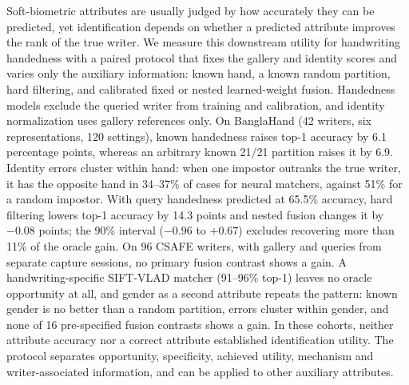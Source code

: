 Soft-biometric attributes are usually judged by how accurately they can be predicted, yet identification depends on whether a predicted attribute improves the rank of the true writer. We measure this downstream utility for handwriting handedness with a paired protocol that fixes the gallery and identity scores and varies only the auxiliary information: known hand, a known random partition, hard filtering, and calibrated fixed or nested learned-weight fusion. Handedness models exclude the queried writer from training and calibration, and identity normalization uses gallery references only. On BanglaHand (42 writers, six representations, 120 settings), known handedness raises top-1 accuracy by 6.1 percentage points, whereas an arbitrary known 21/21 partition raises it by 6.9. Identity errors cluster within hand: when one impostor outranks the true writer, it has the opposite hand in 34--37\% of cases for neural matchers, against 51\% for a random impostor. With query handedness predicted at 65.5\% accuracy, hard filtering lowers top-1 accuracy by 14.3 points and nested fusion changes it by $-0.08$ points; the 90\% interval ($-0.96$ to $+0.67$) excludes recovering more than 11\% of the oracle gain. On 96 CSAFE writers, with gallery and queries from separate capture sessions, no primary fusion contrast shows a gain. A handwriting-specific SIFT-VLAD matcher (91--96\% top-1) leaves no oracle opportunity at all, and gender as a second attribute repeats the pattern: known gender is no better than a random partition, errors cluster within gender, and none of 16 pre-specified fusion contrasts shows a gain. In these cohorts, neither attribute accuracy nor a correct attribute established identification utility. The protocol separates opportunity, specificity, achieved utility, mechanism and writer-associated information, and can be applied to other auxiliary attributes.
